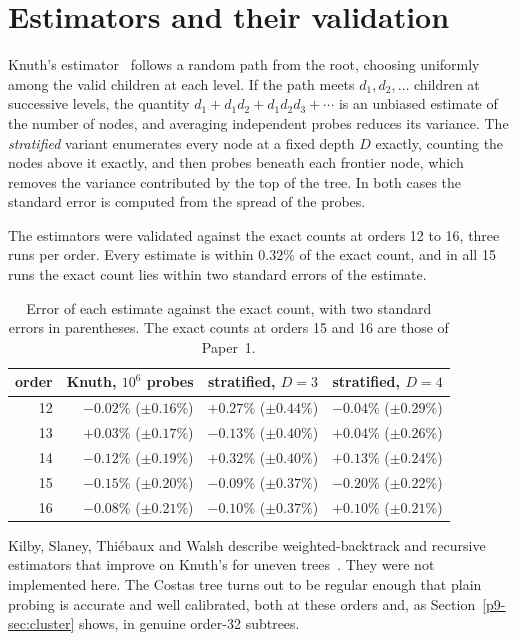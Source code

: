 \documentclass[11pt,a4paper,oneside]{report}
\theoremstyle{definition}
\begin{document}
\section{Estimators and their validation}
\label{p9-sec:validation}
Knuth's estimator~\cite{p9-knuth1975} follows a random path from the root, choosing uniformly among the
valid children at each level. If the path meets $d_1,d_2,\dots$ children at successive levels, the
quantity $d_1+d_1d_2+d_1d_2d_3+\cdots$ is an unbiased estimate of the number of nodes, and averaging
independent probes reduces its variance. The \emph{stratified} variant enumerates every node at a fixed
depth $D$ exactly, counting the nodes above it exactly, and then probes beneath each frontier node,
which removes the variance contributed by the top of the tree. In both cases the standard error is
computed from the spread of the probes.

The estimators were validated against the exact counts at orders 12 to 16, three runs per order.
Every estimate is within $0.32\%$ of the exact count, and in all 15 runs the exact count lies within
two standard errors of the estimate.

\begin{table}[H]
\centering
\small
\begin{tabular}{@{}rrrr@{}}
\toprule
order & Knuth, $10^6$ probes & stratified, $D=3$ & stratified, $D=4$ \\
\midrule
12 & $-0.02\%$ ($\pm0.16\%$) & $+0.27\%$ ($\pm0.44\%$) & $-0.04\%$ ($\pm0.29\%$) \\
13 & $+0.03\%$ ($\pm0.17\%$) & $-0.13\%$ ($\pm0.40\%$) & $+0.04\%$ ($\pm0.26\%$) \\
14 & $-0.12\%$ ($\pm0.19\%$) & $+0.32\%$ ($\pm0.40\%$) & $+0.13\%$ ($\pm0.24\%$) \\
15 & $-0.15\%$ ($\pm0.20\%$) & $-0.09\%$ ($\pm0.37\%$) & $-0.20\%$ ($\pm0.22\%$) \\
16 & $-0.08\%$ ($\pm0.21\%$) & $-0.10\%$ ($\pm0.37\%$) & $+0.10\%$ ($\pm0.21\%$) \\
\bottomrule
\end{tabular}
\caption{Error of each estimate against the exact count, with two standard errors in parentheses. The
exact counts at orders 15 and 16 are those of Paper~1.}
\label{p9-tab:validation}
\end{table}

Kilby, Slaney, Thi\'ebaux and Walsh describe weighted-backtrack and recursive estimators that improve
on Knuth's for uneven trees~\cite{p9-kilby2006}. They were not implemented here. The Costas tree turns out
to be regular enough that plain probing is accurate and well calibrated, both at these orders and,
as Section~\ref{p9-sec:cluster} shows, in genuine order-32 subtrees.
\end{document}
